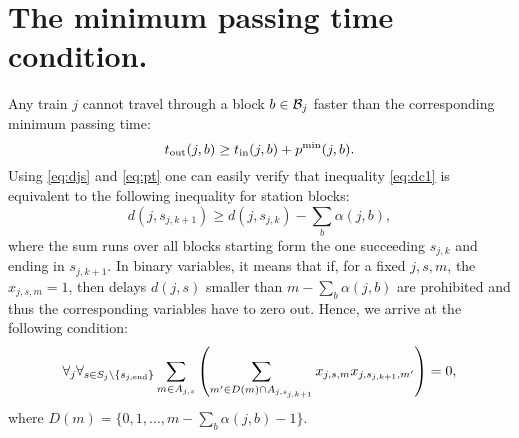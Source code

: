 \section{The minimum passing time condition.}
Any train $j$ cannot travel through a block $b \in \mathcal{B}_j$ faster than the corresponding minimum
passing time:
\begin{equation}
  \label{eq:dc1}
  t_\text{out}(j, b) \ge t_\text{in}(j, b) + p^\text{min}(j, b).
\end{equation}
Using \eqref{eq:djs} and \eqref{eq:pt} one can easily verify that inequality
\eqref{eq:dc1} is equivalent to the following inequality for station blocks:
\begin{equation}
  \label{eq:passingtime}
  d(j, s_{j,k+1}) \ge d(j, s_{j,k}) - \sum_{b}\alpha(j, b),
\end{equation}
where the sum runs over all blocks starting form the one succeeding $s_{j,k}$
and ending in $s_{j,k+1}$.
In binary variables, it means that if, for a fixed $j,s,m$, the $x_{j,s,m}=1$,
then delays $d(j,s)$ smaller than $m-\sum_{b}\alpha(j, b)$ are prohibited
and thus the corresponding variables have to zero out. Hence, we arrive at the
following condition:
\begin{equation}
  \label{eq:qubo:passingtime}
  \forall_{j} \forall_{s \in S_j \setminus \{s_{{j,\operatorname*{end}}}\}}
  \sum_{m \in A_{j,s}}
  \left(
  \sum_{ m' \in D(m) \cap A_{j, s_{j,k+1}}} x_{j, s, m}
  x_{j, s_{j,k+1}, m'} \right) = 0,
\end{equation}
where $D(m) = \{0, 1, \ldots, m - \sum_{b}\alpha(j, b) -1\}$.
